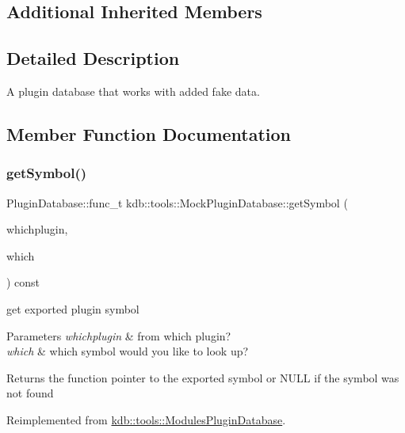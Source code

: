 \subsection*{Additional Inherited Members}


\subsection{Detailed Description}
A plugin database that works with added fake data. 

\subsection{Member Function Documentation}
\mbox{\label{classkdb_1_1tools_1_1MockPluginDatabase_a5a701fd310be0e9f7d14a865c0226517}} 
\subsubsection{\texorpdfstring{getSymbol()}{getSymbol()}}
{\footnotesize\ttfamily Plugin\+Database\+::func\+\_\+t kdb\+::tools\+::\+Mock\+Plugin\+Database\+::get\+Symbol (\begin{DoxyParamCaption}\item[{\mbox{\hyperlink{classkdb_1_1tools_1_1PluginSpec}{Plugin\+Spec}} const \&}]{whichplugin,  }\item[{std\+::string const \&}]{which }\end{DoxyParamCaption}) const\hspace{0.3cm}{\ttfamily [virtual]}}



get exported plugin symbol 


\begin{DoxyParams}{Parameters}
{\em whichplugin} & from which plugin? \\
\hline
{\em which} & which symbol would you like to look up?\\
\hline
\end{DoxyParams}
\begin{DoxyReturn}{Returns}
the function pointer to the exported symbol or N\+U\+LL if the symbol was not found 
\end{DoxyReturn}


Reimplemented from \mbox{\hyperlink{classkdb_1_1tools_1_1ModulesPluginDatabase_a0e81e1b7b296a52f8040fd966b461c3a}{kdb\+::tools\+::\+Modules\+Plugin\+Database}}.

